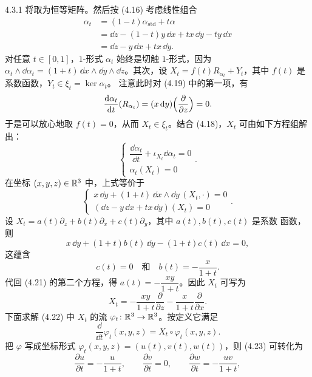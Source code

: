 \begin{wexam}{4.3.1}
  将取为恒等矩阵。然后按 (4.16) 考虑线性组合
  \begin{equation*}
    \begin{aligned}
      \alpha_t&=(1-t)\alpha_{\mathrm{std}}+t\alpha\\
      &=\dd z-(1-t)y\,\dd x+tx\,\dd y-ty\,\dd x\\
      &=\dd z-y\,\dd x+tx\,\dd y.
    \end{aligned}
  \end{equation*}
  对任意 $t\in[0,1]$，$1$-形式 $\alpha_t$ 始终是切触 $1$-形式，因为
  $\alpha_t\wedge\dd\alpha_t=(1+t)\,\dd x\wedge\dd y\wedge\dd z$。其次，设
  $X_t=f(t)R_{\alpha_t}+Y_t$，其中 $f(t)$ 是系数函数，$Y_t\in\xi_t=\ker\alpha_t$。
  注意此时对 (4.19) 中的第一项，有
  \begin{equation*}
    \frac{\mathrm{d}\alpha_t}{\mathrm{d} t}(R_{\alpha_t})
    =(x\,\mathrm{d} y)\Bigl(\frac{\partial}{\partial z}\Bigr)=0.
  \end{equation*}
  于是可以放心地取 $f(t)=0$，从而 $X_t\in\xi_t$。结合 (4.18)，$X_t$ 可由如下方程组解出：
  \begin{equation*}
    \begin{cases}
      \dfrac{\dd\alpha_t}{\dd t}+\iota_{X_t}\dd\alpha_t=0\\[2pt]
      \alpha_t(X_t)=0
    \end{cases}.
  \end{equation*}
  在坐标 $(x,y,z)\in\mathbb{R}^3$ 中，上式等价于
  \begin{equation}\tag{4.21}
    \begin{cases}
      x\,\dd y+(1+t)\,\dd x\wedge\dd y\,(X_t,\cdot)=0\\[2pt]
      (\dd z-y\,\dd x+tx\,\dd y)(X_t)=0
    \end{cases}.
  \end{equation}
  设 $X_t=a(t)\partial_z+b(t)\partial_x+c(t)\partial_y$，其中 $a(t),b(t),c(t)$ 是系数
  函数，则
  \begin{equation*}
    x\,\dd y+(1+t)b(t)\,\dd y-(1+t)c(t)\,\dd x=0,
  \end{equation*}
  这蕴含
  \begin{equation*}
    c(t)=0\quad\text{和}\quad b(t)=-\frac{x}{1+t}.
  \end{equation*}
  代回 (4.21) 的第二个方程，得 $a(t)=-\dfrac{xy}{1+t}$。因此 $X_t$ 可写为
  \begin{equation}\tag{4.22}
    X_t=-\frac{xy}{1+t}\frac{\partial}{\partial z}-\frac{x}{1+t}\frac{\partial}{\partial x}.
  \end{equation}
  下面求解 (4.22) 中 $X_t$ 的流 $\varphi_t\colon\mathbb{R}^3\to\mathbb{R}^3$。按定义它满足
  \begin{equation}\tag{4.23}
    \frac{\dd}{\dd t}\varphi_t(x,y,z)=X_t\circ\varphi_t(x,y,z).
  \end{equation}
  把 $\varphi$ 写成坐标形式 $\varphi_t(x,y,z)=(u(t),v(t),w(t))$，则 (4.23) 可转化为
  \begin{equation*}
    \frac{\partial u}{\partial t}=-\frac{u}{1+t},\qquad
    \frac{\partial v}{\partial t}=0,\qquad
    \frac{\partial w}{\partial t}=-\frac{uv}{1+t},
  \end{equation*}


\end{wexam}
